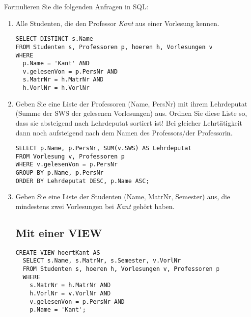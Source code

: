 \documentclass{lehramt-informatik-haupt}
\begin{document}
\noindent
Formulieren Sie die folgenden Anfragen in SQL:

\begin{enumerate}


\item Alle Studenten, die den Professor \emph{Kant} aus einer Vorlesung
kennen.

\begin{antwort}[muster]
\begin{verbatim}
SELECT DISTINCT s.Name
FROM Studenten s, Professoren p, hoeren h, Vorlesungen v
WHERE
  p.Name = 'Kant' AND
  v.gelesenVon = p.PersNr AND
  s.MatrNr = h.MatrNr AND
  h.VorlNr = h.VorlNr
\end{verbatim}
\end{antwort}


\item Geben Sie eine Liste der Professoren (Name, PersNr) mit ihrem
Lehrdeputat (Summe der SWS der gelesenen Vorlesungen) aus. Ordnen Sie
diese Liste so, dass sie absteigend nach Lehrdeputat sortiert ist! Bei
gleicher Lehrtätigkeit dann noch aufsteigend nach dem Namen des
Professors/der Professorin.

\begin{antwort}[muster]
\begin{verbatim}
SELECT p.Name, p.PersNr, SUM(v.SWS) AS Lehrdeputat
FROM Vorlesung v, Professoren p
WHERE v.gelesenVon = p.PersNr
GROUP BY p.Name, p.PersNr
ORDER BY Lehrdeputat DESC, p.Name ASC;
\end{verbatim}
\end{antwort}


\item Geben Sie eine Liste der Studenten (Name, MatrNr, Semester) aus,
die mindestens zwei Vorlesungen bei \emph{Kant} gehört haben.

\begin{antwort}[muster]
\subsection*{Mit einer VIEW}

\begin{verbatim}
CREATE VIEW hoertKant AS
  SELECT s.Name, s.MatrNr, s.Semester, v.VorlNr
  FROM Studenten s, hoeren h, Vorlesungen v, Professoren p
  WHERE
    s.MatrNr = h.MatrNr AND
    h.VorlNr = v.VorlNr AND
    v.gelesenVon = p.PersNr AND
    p.Name = 'Kant';
\end{verbatim}


\end{antwort}
\end{enumerate}
\end{document}
